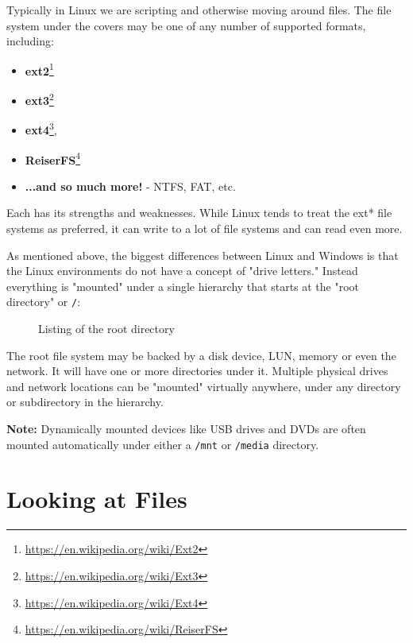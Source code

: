 \documentclass[10pt,american,]{book}
\newenvironment{Shaded}{\begin{snugshade}}{\end{snugshade}}
\newcommand{\KeywordTok}[1]{\textcolor[rgb]{0.13,0.29,0.53}{\textbf{{#1}}}}
\newcommand{\NormalTok}[1]{{#1}}
\renewcommand{\href}[2]{#2\footnote{\url{#1}}}
\numberwithin{figure}{chapter}
\DeclareRobustCommand{\drcap}[1]{\begin{figure}[H]\caption{#1}\end{figure}}
\renewcommand{\KeywordTok}[1]{{#1}}
\renewcommand{\NormalTok}[1]{{#1}}
\begin{document}
Typically in Linux we are scripting and otherwise moving around files.
The file system under the covers may be one of any number of supported
formats, including:

\begin{itemize}
\item
  \href{https://en.wikipedia.org/wiki/Ext2}{\textbf{ext2}}
\item
  \href{https://en.wikipedia.org/wiki/Ext3}{\textbf{ext3}}
\item
  \href{https://en.wikipedia.org/wiki/Ext4}{\textbf{ext4}},
\item
  \href{https://en.wikipedia.org/wiki/ReiserFS}{\textbf{ReiserFS}}
\item
  \textbf{...and so much more!} - NTFS, FAT, etc.
\end{itemize}

Each has its strengths and weaknesses. While Linux tends to treat the
ext* file systems as preferred, it can write to a lot of file systems
and can read even more.

As mentioned above, the biggest differences between Linux and Windows is
that the Linux environments do not have a concept of "drive letters."
Instead everything is "mounted" under a single hierarchy that starts at
the "root directory" or \texttt{/}:

\drcap{Listing of the root directory}

\begin{Shaded}
\end{Shaded}

The root file system may be backed by a disk device, LUN, memory or even
the network. It will have one or more directories under it. Multiple
physical drives and network locations can be "mounted" virtually
anywhere, under any directory or subdirectory in the hierarchy.

\textbf{Note:} Dynamically mounted devices like USB drives and DVDs are
often mounted automatically under either a \texttt{/mnt} or
\texttt{/media} directory.

\section*{Looking at Files}\label{looking-at-files}
\end{document}
